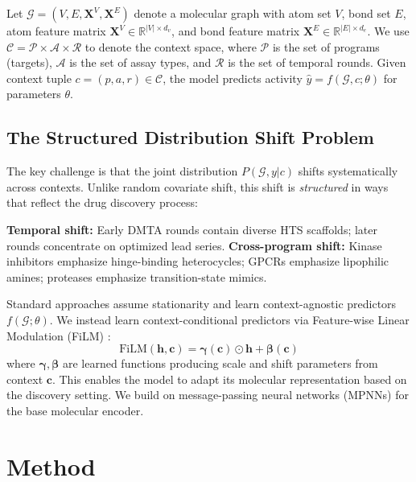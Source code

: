 \documentclass{article}
\newcommand{\film}{\text{FiLM}}
\begin{document}
Let $\mathcal{G} = (V, E, \mathbf{X}^V, \mathbf{X}^E)$ denote a molecular graph with atom set $V$, bond set $E$, atom feature matrix $\mathbf{X}^V \in \mathbb{R}^{|V| \times d_v}$, and bond feature matrix $\mathbf{X}^E \in \mathbb{R}^{|E| \times d_e}$. We use $\mathcal{C} = \mathcal{P} \times \mathcal{A} \times \mathcal{R}$ to denote the context space, where $\mathcal{P}$ is the set of programs (targets), $\mathcal{A}$ is the set of assay types, and $\mathcal{R}$ is the set of temporal rounds. Given context tuple $c = (p, a, r) \in \mathcal{C}$, the model predicts activity $\hat{y} = f(\mathcal{G}, c; \theta)$ for parameters $\theta$.

\subsection{The Structured Distribution Shift Problem}

The key challenge is that the joint distribution $P(\mathcal{G}, y | c)$ shifts systematically across contexts. Unlike random covariate shift, this shift is \textit{structured} in ways that reflect the drug discovery process:

\textbf{Temporal shift:} Early DMTA rounds contain diverse HTS scaffolds; later rounds concentrate on optimized lead series. \textbf{Cross-program shift:} Kinase inhibitors emphasize hinge-binding heterocycles; GPCRs emphasize lipophilic amines; proteases emphasize transition-state mimics.

Standard approaches assume stationarity and learn context-agnostic predictors $f(\mathcal{G}; \theta)$. We instead learn context-conditional predictors via Feature-wise Linear Modulation (FiLM) \citep{perez_2018_film}:
\begin{equation}
    \film(\mathbf{h}, \mathbf{c}) = \boldsymbol{\gamma}(\mathbf{c}) \odot \mathbf{h} + \boldsymbol{\beta}(\mathbf{c})
\end{equation}
where $\boldsymbol{\gamma}, \boldsymbol{\beta}$ are learned functions producing scale and shift parameters from context $\mathbf{c}$. This enables the model to adapt its molecular representation based on the discovery setting. We build on message-passing neural networks (MPNNs) \citep{gilmer_2017_mpnn} for the base molecular encoder.

\section{Method}
\label{sec:method}
\end{document}
